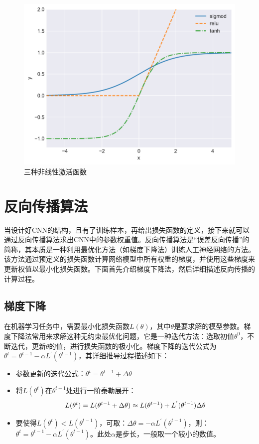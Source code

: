 \begin{figure}[htbp]
    \begin{center}
    \includegraphics[height=0.4\textwidth]{figures/relu.pdf}
    \end{center}
    \caption{三种非线性激活函数}\label{figure:figure6}
\end{figure}

\section{反向传播算法}

当设计好CNN的结构，且有了训练样本，再给出损失函数的定义，接下来就可以通过反向传播算法求出CNN中的参数权重值。反向传播算法是“误差反向传播”的简称，其本质是一种利用最优化方法（如梯度下降法）训练人工神经网络的方法。该方法通过预定义的损失函数计算网络模型中所有权重的梯度，并使用这些梯度来更新权值以最小化损失函数。下面首先介绍梯度下降法，然后详细描述反向传播的计算过程。

\subsection{梯度下降}
在机器学习任务中，需要最小化损失函数$L(\theta)$，其中$\theta$是要求解的模型参数。梯度下降法常用来求解这种无约束最优化问题，它是一种迭代方法：选取初值$\theta^0$，不断迭代，更新$\theta$的值，进行损失函数的极小化。梯度下降的迭代公式为$\theta^t=\theta^{t-1}-\alpha L^{'}(\theta^{t-1})$，其详细推导过程描述如下：

\begin{itemize}
  \item 参数更新的迭代公式：$\theta^t=\theta^{t-1}+\Delta\theta$
  \item 将$L(\theta^t)$在$\theta^{t-1}$处进行一阶泰勒展开：
  $$
  L(\theta^t)=L(\theta^{t-1}+\Delta\theta) \\
  \approx L(\theta^{t-1}) + L^{'}(\theta^{t-1})\Delta\theta
  $$
  \item 要使得$L(\theta^t) < L(\theta^{t-1})$，可取：$\Delta\theta=-\alpha L^{'}(\theta^{t-1})$，则：$\theta^t=\theta^{t-1}-\alpha L^{'}(\theta^{t-1})$。此处$\alpha$是步长，一般取一个较小的数值。
\end{itemize}


